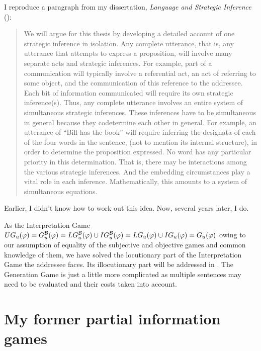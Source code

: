 I reproduce a paragraph from my dissertation, \emph{Language and Strategic Inference} (\citeyear[5]{parikh:diss}):

\begin{quote}
We will argue for this thesis by developing a detailed account of one
strategic inference in isolation.  Any complete utterance, that is,
any utterance that attempts to express a proposition, will involve
many separate acts and strategic inferences.  For example, part of a
communication will typically involve a referential act, an act of
referring to some object, and the communication of this reference to
the addressee.  Each bit of information communicated will require its
own strategic inference(s).  Thus, any complete utterance involves an
entire system of simultaneous strategic inferences.  These inferences
have to be simultaneous in general because they codetermine each other
in general.  For example, an utterance of ``Bill has the book'' will
require inferring the designata of each of the four words in the
sentence, (not to mention its internal structure), in order to 
determine the proposition expressed.  No word has
any particular priority in this determination. That is, there may be
interactions among the various strategic inferences.  And the
embedding circumstances play a vital role in each inference.
Mathematically, this amounts to a system of simultaneous equations.

\end{quote}
 

Earlier, I didn't know how to work out this idea. Now, several years later, I do.

As the Interpretation Game $UG_u(\varphi) = G^{\cal B}_u(\varphi) = LG^{\cal B}_u(\varphi) \cup IG^{\cal B}_u(\varphi) = LG_u(\varphi) \cup IG_u(\varphi) = G_u(\varphi)$ owing to our assumption of equality of the subjective and objective games and common knowledge of them, we have solved the locutionary part of the Interpretation Game the addressee faces. Its illocutionary part will be addressed in . The Generation Game is just a little more complicated as multiple sentences may need to be evaluated and their costs taken into account.


\section{My former partial information games} \label{sec:old partial information game}

